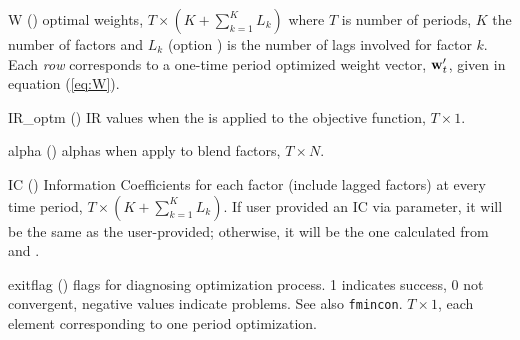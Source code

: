 \outarg
  \begin{argdesc}
  \item[W]   (\myfints{}) optimal weights, $T\times (K+\sum_{k=1}^K L_k)$ where $T$ is number of periods, 
     $K$ the number of factors and $L_k$ (option ) is the number of lags involved for factor $k$. 
     Each \emph{row} corresponds to a one-time period optimized weight vector, $\mathbf{w}'_t$, given in equation (\ref{eq:W}).
  \item[IR\_optm] (\myfints{}) IR values when the  is applied to the objective function, $T\times 1$.
  \item[alpha] (\myfints{}) alphas when apply  to blend factors, $T\times N$.
  \item[IC] (\myfints{}) Information Coefficients for each factor (include lagged factors) at every time period, $T\times (K+\sum_{k=1}^K L_k)$.
            If user provided an IC via  parameter, it will be the same as the user-provided; 
            otherwise, it will be the one  calculated from  and .
  \item[exitflag] (\myfints{}) flags for diagnosing optimization process. 1 indicates success, 0 not convergent, negative values indicate
     problems. See also \texttt{fmincon}. $T\times 1$, each element corresponding to one period optimization.
  \end{argdesc}

